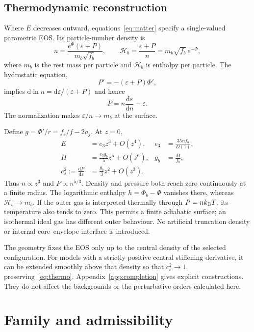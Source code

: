 \documentclass[journal,a4paper]{IEEEtran}
\newcommand{\dd}{\mathrm d}
\begin{document}
\subsection{Thermodynamic reconstruction}
Where $E$ decreases outward, equations~\eqref{eq:matter} specify a single-valued parametric EOS. Its particle-number density is
\begin{equation}
 n=\frac{e^\Phi(\varepsilon+P)}{m_b\sqrt{f_b}},
 \qquad \mathcal H_b=\frac{\varepsilon+P}{n}=m_b\sqrt{f_b}\,e^{-\Phi},
 \label{eq:n}
\end{equation}
where $m_b$ is the rest mass per particle and $\mathcal H_b$ is enthalpy per particle. The hydrostatic equation,
\begin{equation}
 P'=-(\varepsilon+P)\Phi',
\end{equation}
implies $\dd\ln n=\dd\varepsilon/(\varepsilon+P)$ and hence
\begin{equation}
 P=n\frac{\dd\varepsilon}{\dd n}-\varepsilon.
 \label{eq:thermo}
\end{equation}
The normalization makes $\varepsilon/n\to m_b$ at the surface.

Define $g=\Phi'/r=f_s/f-2a_j$. At $z=0$,
\begin{align}
 E&=e_3z^3+O(z^4),& e_3&=\frac{35\alpha f_b}{D(1)},\nonumber\\
 \Pi&=\frac{e_3g_b}{5}z^5+O(z^6),&g_b&=\frac{M}{f_b},\label{eq:surfacepowers}\\
 c_s^2:=\frac{\dd P}{\dd\varepsilon}
 &=\frac{g_b}{3}z^2+O(z^3).&&\nonumber
\end{align}
Thus $n\propto z^3$ and $P\propto n^{5/3}$. Density and pressure both reach zero continuously at a finite radius. The logarithmic enthalpy $h=\Phi_b-\Phi$ vanishes there, whereas $\mathcal H_b\to m_b$. If the outer gas is interpreted thermally through $P=nk_{\rm B}T$, its temperature also tends to zero. This permits a finite adiabatic surface; an isothermal ideal gas has different outer behaviour. No artificial truncation density or internal core--envelope interface is introduced.

The geometry fixes the EOS only up to the central density of the selected configuration. For models with a strictly positive central stiffening derivative, it can be extended smoothly above that density so that $c_s^2\to1$, preserving~\eqref{eq:thermo}. Appendix~\ref{app:completion} gives explicit constructions. They do not affect the backgrounds or the perturbative orders calculated here.

\section{Family and admissibility}
\end{document}
